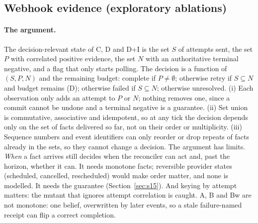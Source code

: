 \documentclass[11pt]{article}
\begin{document}
\subsection{Webhook evidence (exploratory ablations)}\label{sec:webhooks}

\paragraph{The argument.} The decision-relevant state of C, D and D+I is the set $S$ of attempts sent, the set $P$ with correlated positive evidence, the set $N$ with an authoritative terminal negative, and a flag that only starts polling. The decision is a function of $(S, P, N)$ and the remaining budget: complete if $P \neq \emptyset$; otherwise retry if $S \subseteq N$ and budget remains (D); otherwise failed if $S \subseteq N$; otherwise unresolved. (i) Each observation only adds an attempt to $P$ or $N$; nothing removes one, since a commit cannot be undone and a terminal negative is a guarantee. (ii) Set union is commutative, associative and idempotent, so at any tick the decision depends only on the set of facts delivered so far, not on their order or multiplicity. (iii) Sequence numbers and event identifiers can only reorder or drop repeats of facts already in the sets, so they cannot change a decision. The argument has limits. \emph{When} a fact arrives still decides when the reconciler can act and, past the horizon, whether it can. It needs monotone facts; reversible provider states (scheduled, cancelled, rescheduled) would make order matter, and none is modelled. It needs the guarantee (Section~\ref{sec:s15}). And keying by attempt matters: the mutant that ignores attempt correlation is caught. A, B and Bw are not monotone: one belief, overwritten by later events, so a stale failure-named receipt can flip a correct completion.
\end{document}
